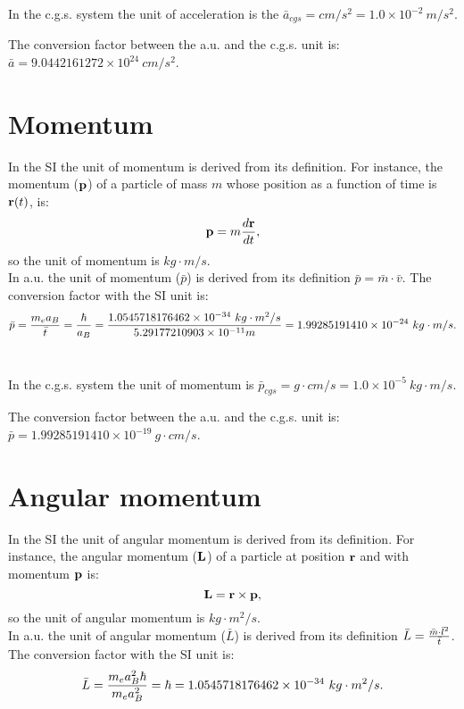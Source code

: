 \documentclass[12pt,a4paper]{article}
\def\hbarf{1.0545718176462\times 10^{-34}}
\def\barl{5.29177210903\times 10^{-11}}
\def\barp{1.99285191410\times 10^{-24}}
\def\cmtom{1.0\times 10^{-2}}
\def\ptop{1.0\times 10^{-5}}
\def\baracgs{9.0442161272\times 10^{24}}
\def\barpcgs{1.99285191410\times 10^{-19}}
\begin{document}
{\color{orange} In the c.g.s. system the unit of acceleration is the $\bar a_{cgs}=cm/s^2 = \cmtom\ m/s^2$.
\\
}

{\color{green} The conversion factor between the a.u. and the c.g.s. unit is:
$\bar a=\baracgs\ cm/s^2$.
\\
}

\newpage
\section{\color{coral}Momentum}
In the SI the unit of momentum is derived from its definition.
For instance, the momentum (${\bf p}$) of a particle of mass $m$ whose
position as a function of time is ${\bf r}(t)$, is:
\begin{equation}
{\bf p}=m {d{\bf r} \over dt},
\end{equation} 
so the unit of momentum is $kg\cdot m/s$.
\\

{\color{web-blue} In a.u. the unit of momentum ($\bar p$) is derived 
from its definition $\bar p = \bar m \cdot \bar v$. 
The conversion factor with the SI unit is:
\begin{equation}
\bar p = {m_e a_B \over \bar t}= {\hbar \over a_B} =
{\hbarf\ kg\cdot m^2/s \over \barl m}=\barp\ kg\cdot m/s.
\end{equation}
\\ }

{\color{orange} In the c.g.s. system the unit of momentum is 
$\bar p_{cgs}=g\cdot cm/s = \ptop\ kg\cdot m/s$.
\\
}

{\color{green} The conversion factor between the a.u. and the c.g.s. unit is:
$\bar p=\barpcgs\ g\cdot cm/s$.
\\
}

\newpage
\section{\color{coral}Angular momentum}
In the SI the unit of angular momentum is derived from its
definition. For instance, the angular momentum (${\bf L}$) 
of a particle at position ${\bf r}$ and with momentum ${\bf p}$ is:
\begin{equation}
{\bf L}= {{\bf r} \times {\bf p}},
\end{equation} 
so the unit of angular momentum is $kg\cdot m^2/s$.
\\

{\color{web-blue} In a.u. the unit of angular momentum ($\bar L$) is derived 
from its definition
$\bar L = {\bar m \cdot \bar l^2 \over \bar t}$. 
The conversion factor
with the SI unit is:
\begin{equation}
\bar L={m_e a_B^2 \hbar \over m_e a_B^2}=\hbar=
\hbarf\ kg\cdot m^2/s.
\end{equation}
\\
}
\end{document}
